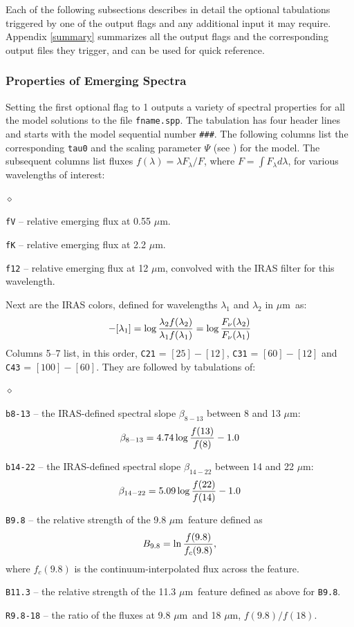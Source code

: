 \documentclass[11pt]{article}
\def\eq#1{\begin{equation} #1 \end{equation}}
\def\mic    {\hbox{$\mu$m}}
\begin{document}
Each of the following subsections describes in detail the optional tabulations
triggered by one of the output flags and any additional input it may require.
Appendix \ref{summary} summarizes all the output flags and the corresponding
output files they trigger, and can be used for quick reference.


\subsubsection{Properties of Emerging Spectra}
\label{fname.spp}

Setting the first optional flag to 1 outputs a variety of spectral properties
for all the model solutions to the file {\tt fname.spp}. The tabulation has
four header lines and starts with the model sequential number {\tt \#\#\#}.
The following columns list the corresponding {\tt tau0} and the scaling
parameter $\Psi$ (see \cite{IE97}) for the model. The subsequent columns list
fluxes $f(\lambda) = \lambda F_\lambda/F$, where $F = \int\!F_\lambda
d\lambda$, for various wavelengths of interest:
\begin{list}{$\diamond$}{}
\item {\tt fV} -- relative emerging flux at 0.55 \mic.
\item {\tt fK} -- relative emerging flux at 2.2 \mic.
\item
{\tt f12} -- relative emerging flux at 12 \mic, convolved with the IRAS
filter for this wavelength.
\end{list}
Next are the IRAS colors, defined for wavelengths $\lambda_1$ and $\lambda_2$
in \mic\ as:
\eq{
  [\lambda_2] - [\lambda_1]
  =  \log{\lambda_2 f(\lambda_2) \over \lambda_1 f(\lambda_1)}
  =  \log{F_\nu(\lambda_2) \over F_\nu(\lambda_1)}
}
Columns 5--7 list, in this order, {\tt C21} = $[25] - [12]$, {\tt C31} = $[60]
- [12]$ and {\tt C43} = $[100] - [60]$. They are followed by tabulations of:

\begin{list}{$\diamond$}{}
\item{\tt b8-13} -- the IRAS-defined spectral slope $\beta_{8-13}$ between
8 and 13 \mic:
$$
    \beta_{8-13} = 4.74\log{f(13) \over f(8)} - 1.0
$$
\item{\tt b14-22} -- the IRAS-defined spectral slope $\beta_{14-22}$ between
14 and 22 \mic:
$$
    \beta_{14-22} = 5.09\log{f(22) \over f(14)} - 1.0
$$
\item {\tt B9.8} -- the relative strength of the 9.8 \mic\ feature defined as
$$
    B_{9.8} = \ln{f(9.8) \over f_c(9.8)},
$$
where $f_c(9.8)$ is the continuum-interpolated flux across the feature.
\item
{\tt B11.3} -- the relative strength of the 11.3 \mic\ feature defined as
above for {\tt B9.8}.
\item{\tt R9.8-18} -- the ratio of the fluxes at 9.8 \mic\ and 18 \mic,
$f(9.8)/f(18)$.

\end{list}
\end{document}
